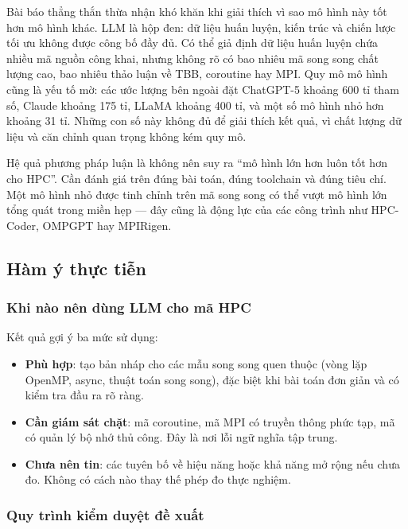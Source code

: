 Bài báo thẳng thắn thừa nhận khó khăn khi giải thích vì sao mô hình này tốt hơn
mô hình khác. LLM là hộp đen: dữ liệu huấn luyện, kiến trúc và chiến lược tối ưu
không được công bố đầy đủ. Có thể giả định dữ liệu huấn luyện chứa nhiều mã nguồn
công khai, nhưng không rõ có bao nhiêu mã song song chất lượng cao, bao nhiêu
thảo luận về TBB, coroutine hay MPI. Quy mô mô hình cũng là yếu tố mờ: các ước
lượng bên ngoài đặt ChatGPT-5 khoảng 600 tỉ tham số, Claude khoảng 175 tỉ, LLaMA
khoảng 400 tỉ, và một số mô hình nhỏ hơn khoảng 31 tỉ. Những con số này không đủ
để giải thích kết quả, vì chất lượng dữ liệu và căn chỉnh quan trọng không kém quy
mô.

Hệ quả phương pháp luận là không nên suy ra “mô hình lớn hơn luôn tốt hơn cho
HPC”. Cần đánh giá trên đúng bài toán, đúng toolchain và đúng tiêu chí. Một mô
hình nhỏ được tinh chỉnh trên mã song song có thể vượt mô hình lớn tổng quát
trong miền hẹp — đây cũng là động lực của các công trình như HPC-Coder, OMPGPT
hay MPIRigen.

\subsection{Hàm ý thực tiễn}

\subsubsection{Khi nào nên dùng LLM cho mã HPC}

Kết quả gợi ý ba mức sử dụng:

\begin{itemize}
  \item \textbf{Phù hợp}: tạo bản nháp cho các mẫu song song quen thuộc (vòng lặp
        OpenMP, async, thuật toán song song), đặc biệt khi bài toán đơn giản và
        có kiểm tra đầu ra rõ ràng.
  \item \textbf{Cần giám sát chặt}: mã coroutine, mã MPI có truyền thông phức
        tạp, mã có quản lý bộ nhớ thủ công. Đây là nơi lỗi ngữ nghĩa tập trung.
  \item \textbf{Chưa nên tin}: các tuyên bố về hiệu năng hoặc khả năng mở rộng
        nếu chưa đo. Không có cách nào thay thế phép đo thực nghiệm.
\end{itemize}

\subsubsection{Quy trình kiểm duyệt đề xuất}

